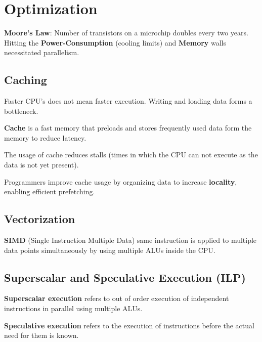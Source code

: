 \section{Optimization}

\begin{theorem}
\textbf{Moore's Law}: Number of transistors on a microchip doubles every two years.
Hitting the \textbf{Power-Consumption} (cooling limits) and \textbf{Memory} walls necessitated parallelism.
\end{theorem}

\subsection{Caching}
Faster CPU's does not mean faster execution. Writing and loading data forms a bottleneck.

\begin{definition}
\textbf{Cache} is a fast memory that preloads and stores frequently used data form the memory to reduce
latency.
\end{definition}

The usage of cache reduces stalls (times in which the CPU can not execute as the data is not yet present).
\begin{remark}
Programmers improve cache usage by organizing data to increase \textbf{locality}, enabling efficient prefetching.
\end{remark}

\subsection{Vectorization}

\begin{definition}
\textbf{SIMD} (Single Instruction Multiple Data) same instruction is applied to multiple data points simultaneously by using multiple ALUs inside the CPU.
\end{definition}

\subsection{Superscalar and Speculative Execution (ILP)}

\begin{definition}
\textbf{Superscalar execution} refers to out of order execution of independent instructions in parallel using multiple ALUs.
\end{definition}

\begin{definition}
\textbf{Speculative execution} refers to the execution of instructions before the actual need for them is known.
\end{definition}

